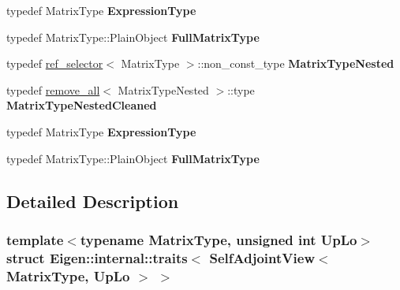 \begin{DoxyCompactItemize}
typedef Matrix\+Type {\bfseries Expression\+Type}
\item 
\mbox{\label{struct_eigen_1_1internal_1_1traits_3_01_self_adjoint_view_3_01_matrix_type_00_01_up_lo_01_4_01_4_a0580ec066d0f63149d93af28a0c1ce84}} 
typedef Matrix\+Type\+::\+Plain\+Object {\bfseries Full\+Matrix\+Type}
\item 
\mbox{\label{struct_eigen_1_1internal_1_1traits_3_01_self_adjoint_view_3_01_matrix_type_00_01_up_lo_01_4_01_4_a78fbe1472ee4d87826b253c2b194062b}} 
typedef \hyperlink{struct_eigen_1_1internal_1_1ref__selector}{ref\+\_\+selector}$<$ Matrix\+Type $>$\+::non\+\_\+const\+\_\+type {\bfseries Matrix\+Type\+Nested}
\item 
\mbox{\label{struct_eigen_1_1internal_1_1traits_3_01_self_adjoint_view_3_01_matrix_type_00_01_up_lo_01_4_01_4_a9a5dcf20cb07f9a3fb8f7ec32f8eaaad}} 
typedef \hyperlink{struct_eigen_1_1internal_1_1remove__all}{remove\+\_\+all}$<$ Matrix\+Type\+Nested $>$\+::type {\bfseries Matrix\+Type\+Nested\+Cleaned}
\item 
\mbox{\label{struct_eigen_1_1internal_1_1traits_3_01_self_adjoint_view_3_01_matrix_type_00_01_up_lo_01_4_01_4_aeaf9375b523c8415dddb7e48b60a3347}} 
typedef Matrix\+Type {\bfseries Expression\+Type}
\item 
\mbox{\label{struct_eigen_1_1internal_1_1traits_3_01_self_adjoint_view_3_01_matrix_type_00_01_up_lo_01_4_01_4_a0580ec066d0f63149d93af28a0c1ce84}} 
typedef Matrix\+Type\+::\+Plain\+Object {\bfseries Full\+Matrix\+Type}
\end{DoxyCompactItemize}


\subsection{Detailed Description}
\subsubsection*{template$<$typename Matrix\+Type, unsigned int Up\+Lo$>$\newline
struct Eigen\+::internal\+::traits$<$ Self\+Adjoint\+View$<$ Matrix\+Type, Up\+Lo $>$ $>$}



